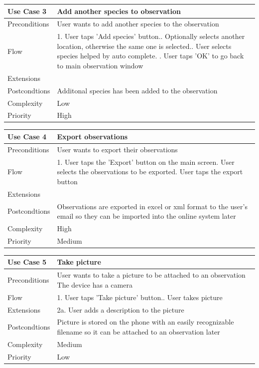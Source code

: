 \begin{tabular}[t]{|l|p{}|}\hline
	Use Case 3&Add another species to observation\\\hline
	Preconditions&User wants to add another species to the observation\\\hline
	Flow&1. User taps 'Add species' button.\newline
	2. Optionally selects another location, otherwise the same one is selected.\newline
	3. User selects species helped by auto complete. \newline
	4. User taps 'OK' to go back to main observation window \\\hline  
	Extensions& \\\hline
	Postcondtions&Additonal species has been added to the observation\\\hline
	Complexity&Low\\\hline
	Priority&High\\\hline
\end{tabular}

\hspace{2em}

\begin{tabular}[t]{|l|p{}|}\hline
	Use Case 4&Export  observations\\\hline
	Preconditions& User wants to export their observations \\\hline
	Flow&1. User taps the 'Export' button on the main screen\newline
	2. User selects the observations to be exported\newline
	3. User taps the export button\\\hline
	Extensions& \\\hline
	Postcondtions&Observations are exported in excel or xml format to the user's email so they can be imported into the online system later\\\hline
	Complexity&High\\\hline
	Priority&Medium\\\hline
\end{tabular}

\hspace{2em}

\begin{tabular}[t]{|l|p{}|}\hline
	Use Case 5&Take picture\\\hline
	Preconditions&User wants to take a picture to be attached to an observation\newline
	The device has a camera\\\hline
	Flow&1. User taps 'Take picture' button.\newline
	2. User takes picture \\\hline
	Extensions& 2a. User adds a description to the picture\\\hline
	Postcondtions&Picture is stored on the phone with an easily recognizable filename so it can be attached to an observation 	later\\\hline
	Complexity&Medium\\\hline
	Priority&Low\\\hline
\end{tabular}
	
